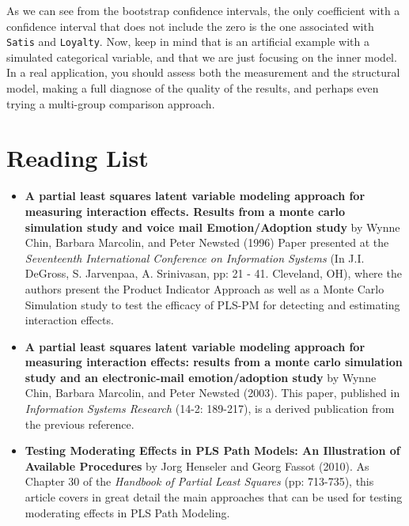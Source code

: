 \documentclass[12pt]{book}\usepackage{graphicx, color}
\newcommand{\code}[1]{\texttt{#1}}
\begin{document}
As we can see from the bootstrap confidence intervals, the only coefficient with a confidence interval that does not include the zero is the one associated with \code{Satis} and \code{Loyalty}. Now, keep in mind that is an artificial example with a simulated categorical variable, and that we are just focusing on the inner model. In a real application, you should assess both the measurement and the structural model, making a full diagnose of the quality of the results, and perhaps even trying a multi-group comparison approach.



\section{Reading List}
\begin{itemize}
 \item \textbf{\textsf{A partial least squares latent variable modeling approach for measuring interaction effects. Results from a monte carlo simulation study and voice mail Emotion/Adoption study}} by Wynne Chin, Barbara Marcolin, and Peter Newsted (1996) Paper presented at the \textit{Seventeenth International Conference on Information Systems} (In J.I. DeGross, S. Jarvenpaa, A. Srinivasan, pp: 21 - 41. Cleveland, OH), where the authors present the Product Indicator Approach as well as a Monte Carlo Simulation study to test the efficacy of PLS-PM for detecting and estimating interaction effects.

 \vspace{2mm}
 \item \textbf{\textsf{A partial least squares latent variable modeling approach for measuring interaction effects: results from a monte carlo simulation study and an electronic-mail emotion/adoption study}} by Wynne Chin, Barbara Marcolin, and Peter Newsted (2003). This paper, published in \textit{Information Systems Research} (14-2: 189-217), is a derived publication from the previous reference.

 \vspace{2mm}
 \item \textbf{\textsf{Testing Moderating Effects in PLS Path Models: An Illustration of Available Procedures}} by Jorg Henseler and Georg Fassot (2010). As Chapter 30 of the \textit{Handbook of Partial Least Squares} (pp: 713-735), this article covers in great detail the main approaches that can be used for testing moderating effects in PLS Path Modeling.
\end{itemize}
\end{document}
